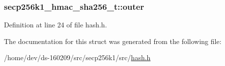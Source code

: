 \hypertarget{structsecp256k1__hmac__sha256__t_a3974e44471231d09a8d282ef62e0b77a}{}
\subsubsection[{outer}]{ secp256k1\+\_\+hmac\+\_\+sha256\+\_\+t\+::outer}\label{structsecp256k1__hmac__sha256__t_a3974e44471231d09a8d282ef62e0b77a}


Definition at line 24 of file hash.\+h.



The documentation for this struct was generated from the following file\+:\begin{DoxyCompactItemize}
\item 
/home/dev/ds-\/160209/src/secp256k1/src/\hyperlink{secp256k1_2src_2hash_8h}{hash.\+h}\end{DoxyCompactItemize}
